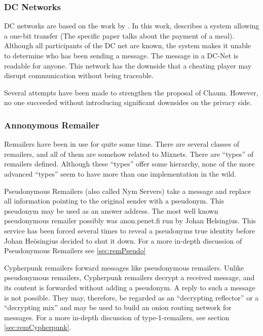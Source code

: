 \subsubsection{DC Networks}
DC networks are based on the work  by \citeauthor{chaum-dc}\cite{chaum-dc}. In this work, \citeauthor{chaum-dc} describes a system allowing a one-bit transfer (The specific paper talks about the payment of a meal). Although all participants of the DC net are known, the system makes it unable to determine who has been sending a message. The message in a DC-Net is readable for anyone. This network has the downside that a cheating player may disrupt communication without being traceable.

Several attempts have been made to strengthen the proposal of Chaum\cite{golle:eurocrypt2004,disco,herbivore:tr,Corrigan-Gibbs:2010:DAA:1866307.1866346}. However, no one succeeded without introducing significant downsides on the privacy side.
\subsubsection{Annonymous Remailer\label{sec:remailer}}
Remailers have been in use for quite some time. There are several classes of remailers, and all of them are somehow related to Mixnets. There are ``types'' of remailers defined. Although these ``types'' offer some hierarchy, none of the more advanced ``types'' seem to have more than one implementation in the wild. 

Pseudonymous Remailers (also called Nym Servers) take a message and replace all information pointing to the original sender with a pseudonym. This pseudonym may be used as an answer address. The most well known pseudonymous remailer possibly was anon.penet.fi run by Johan Helsingius. This service has been forced several times to reveal a pseudonyms true identity before Johan Heösingius decided to shut it down. For a more in-depth discussion of Pseudonymous Remailers see \ref{sec:remPseudo}

Cypherpunk remailers forward messages like pseudonymous remailers. Unlike pseudonymous remailers, Cypherpunk remailers decrypt a received message, and its content is forwarded without adding a pseudonym. A reply to such a message is not possible. They may, therefore, be regarded as an ``decrypting reflector'' or a ``decrypting mix'' and may be used to build an onion routing network for messages. For a more in-depth discussion of type-1-remailers, see section  \ref{sec:remCypherpunk}.

